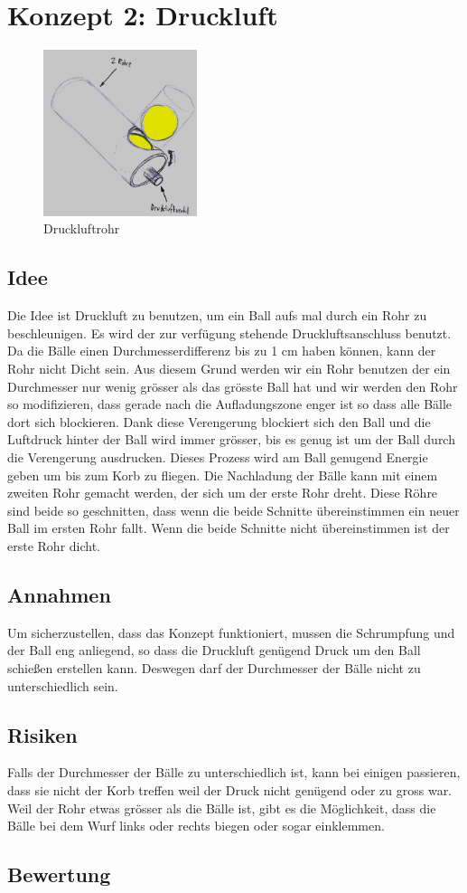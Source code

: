 \section{Konzept 2: Druckluft}
\begin{figure}[h!]
	\centering
	\includegraphics[width=0.4\textwidth]{../../fig/Druckluftrohr.jpg}
	\caption{Druckluftrohr}
	\label{fig:druckluftrohr}
\end{figure}
\subsection{Idee}
Die Idee ist Druckluft zu benutzen, um ein Ball aufs mal durch ein Rohr zu beschleunigen. Es wird der zur verfügung stehende Druckluftsanschluss benutzt. Da die Bälle einen Durchmesserdifferenz bis zu 1 cm haben können, kann der Rohr nicht Dicht sein. Aus diesem Grund werden wir ein Rohr benutzen der ein Durchmesser nur wenig grösser als das grösste Ball hat und wir werden den Rohr so modifizieren, dass gerade nach die Aufladungszone enger ist so dass alle Bälle dort sich blockieren. Dank diese Verengerung blockiert sich den Ball und die Luftdruck hinter der Ball wird immer grösser, bis es genug ist um der Ball durch die Verengerung ausdrucken. Dieses Prozess wird am Ball genugend Energie geben um bis zum Korb zu fliegen.
Die Nachladung der Bälle kann mit einem zweiten Rohr gemacht werden, der sich um der erste Rohr dreht. Diese Röhre sind beide so geschnitten, dass wenn die beide Schnitte übereinstimmen ein neuer Ball im ersten Rohr fallt. Wenn die beide Schnitte nicht übereinstimmen ist der erste Rohr dicht.
\subsection{Annahmen}
Um sicherzustellen, dass das Konzept funktioniert, mussen die Schrumpfung und der Ball eng anliegend, so dass die Druckluft genügend Druck um den Ball schießen erstellen kann. Deswegen darf der Durchmesser der Bälle nicht zu unterschiedlich sein. 

\subsection{Risiken}
Falls der Durchmesser der Bälle zu unterschiedlich ist, kann bei einigen passieren, dass sie nicht der Korb treffen weil der Druck nicht genügend oder zu gross war. Weil der Rohr etwas grösser als die Bälle ist, gibt es die Möglichkeit, dass die Bälle bei dem Wurf links oder rechts biegen oder sogar einklemmen.

\subsection{Bewertung}
